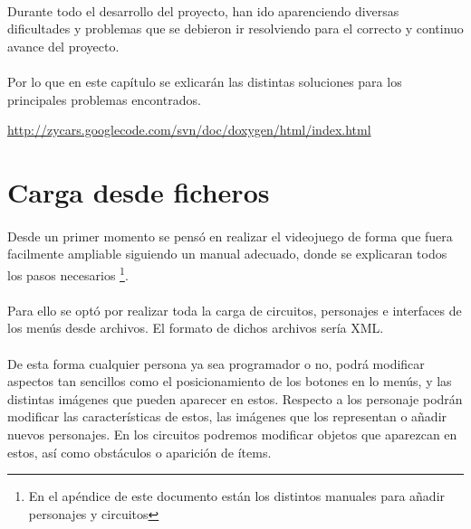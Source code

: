 \paragraph{}
Durante todo el desarrollo del proyecto, han ido aparenciendo diversas dificultades y problemas que se debieron ir
resolviendo para el correcto y continuo avance del proyecto.

\paragraph{}
Por lo que en este capítulo se exlicarán las distintas soluciones para los principales problemas encontrados. 


\url{http://zycars.googlecode.com/svn/doc/doxygen/html/index.html}


\section{Carga desde ficheros}

\paragraph{}
Desde un primer momento se pensó en realizar el videojuego de forma que fuera facilmente ampliable siguiendo un manual adecuado, 
donde se explicaran todos los pasos necesarios \footnote{En el apéndice de este documento están los distintos manuales para
añadir personajes y circuitos}.

\paragraph{}
Para ello se optó por realizar toda la carga de circuitos, personajes e interfaces de los menús desde archivos. El formato de 
dichos archivos sería XML.

\paragraph{}
De esta forma cualquier persona ya sea programador o no, podrá modificar aspectos tan sencillos como el posicionamiento de los 
botones en lo menús, y las distintas imágenes que pueden aparecer en estos. Respecto a los personaje podrán modificar las 
características de estos, las imágenes que los representan o añadir nuevos personajes. En los circuitos podremos modificar objetos
que aparezcan en estos, así como obstáculos o aparición de ítems.

